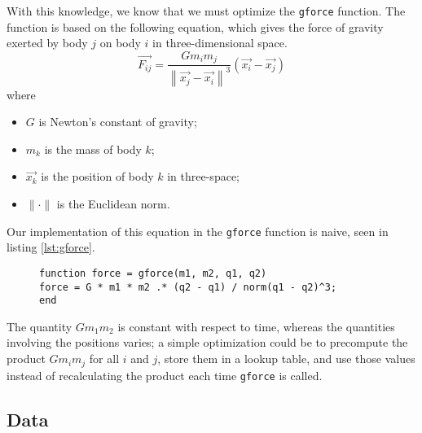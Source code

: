 \documentclass[11pt,letterpaper]{article}
\begin{document}
With this knowledge, we know that we must optimize the \texttt{gforce}
function. The function is based on the following equation, which gives the
force of gravity exerted by body $j$ on body $i$ in three-dimensional space.
\begin{equation}
    \vec{F_{ij}} =
    \frac{G m_i m_j}{\left\| \vec{x_j} - \vec{x_i} \right\|^3}
    \left(\vec{x_i} - \vec{x_j}\right)
    \label{eq:gravity}
\end{equation}
where
\begin{itemize}
    \item $G$ is Newton's constant of gravity;
    \item $m_k$ is the mass of body $k$;
    \item $\vec{x_k}$ is the position of body $k$ in three-space;
    \item $\|\cdot\|$ is the Euclidean norm.
\end{itemize}

Our implementation of this equation in the \texttt{gforce} function is naive,
seen in listing \ref{lst:gforce}.

\begin{figure}[ht]
    \begin{lstlisting}
function force = gforce(m1, m2, q1, q2)
force = G * m1 * m2 .* (q2 - q1) / norm(q1 - q2)^3;
end
    \end{lstlisting}
\end{figure}

The quantity $G m_1 m_2$ is constant with respect to time, whereas the
quantities involving the positions varies; a simple optimization could be to
precompute the product $G m_i m_j$ for all $i$ and $j$, store them in a lookup
table, and use those values instead of recalculating the product each time
\texttt{gforce} is called.

\subsection{Data}
\end{document}
